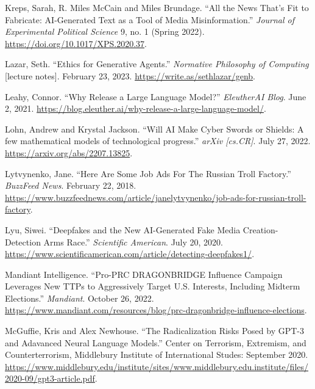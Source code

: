 \documentclass{article}
\begin{document}
\begin{thebibliography}{9}
  Kreps, Sarah, R. Miles McCain and Miles Brundage. ``All the News That's Fit to Fabricate: AI-Generated Text as a Tool of Media Misinformation.'' \textit{Journal of Experimental Political Science} 9, no. 1 (Spring 2022). \href{https://doi.org/10.1017/XPS.2020.37}{https://doi.org/10.1017/XPS.2020.37}.

  Lazar, Seth. ``Ethics for Generative Agents.'' \textit{Normative Philosophy of Computing} [lecture notes]. February 23, 2023. \href{https://write.as/sethlazar/genb}{https://write.as/sethlazar/genb}. 

  Leahy, Connor. ``Why Release a Large Language Model?'' \textit{EleutherAI Blog}. June 2, 2021. \href{https://blog.eleuther.ai/why-release-a-large-language-model/}{https://blog.eleuther.ai/why-release-a-large-language-model/}.

  Lohn, Andrew and Krystal Jackson. ``Will AI Make Cyber Swords or Shields: A few mathematical models of technological progress.'' \textit{arXiv [cs.CR]}. July 27, 2022. \href{https://arxiv.org/abs/2207.13825}{https://arxiv.org/abs/2207.13825}. 

  Lytvynenko, Jane. ``Here Are Some Job Ads For The Russian Troll Factory.'' \textit{BuzzFeed News}. February 22, 2018. \href{https://www.buzzfeednews.com/article/janelytvynenko/job-ads-for-russian-troll-factory}{https://www.buzzfeednews.com/article/janelytvynenko/job-ads-for-russian-troll-factory}.

  Lyu, Siwei. ``Deepfakes and the New AI-Generated Fake Media Creation-Detection Arms Race.'' \textit{Scientific American}. July 20, 2020. \href{https://www.scientificamerican.com/article/detecting-deepfakes1/}{https://www.scientificamerican.com/article/detecting-deepfakes1/}.

  Mandiant Intelligence. ``Pro-PRC DRAGONBRIDGE Influence Campaign Leverages New TTPs to Aggressively Target U.S. Interests, Including Midterm Elections.'' \textit{Mandiant}. October 26, 2022. \href{https://www.mandiant.com/resources/blog/prc-dragonbridge-influence-elections}{https://www.mandiant.com/resources/blog/prc-dragonbridge-influence-elections}.

  McGuffie, Kris and Alex Newhouse. ``The Radicalization Risks Posed by GPT-3 and Adavanced Neural Language Models.'' Center on Terrorism, Extremism, and Counterterrorism, Middlebury Institute of International Studes: September 2020. \href{https://www.middlebury.edu/institute/sites/www.middlebury.edu.institute/files/2020-09/gpt3-article.pdf}{https://www.middlebury.edu/institute/sites/www.middlebury.edu.institute/files/2020-09/gpt3-article.pdf}.


\end{thebibliography}
\end{document}
